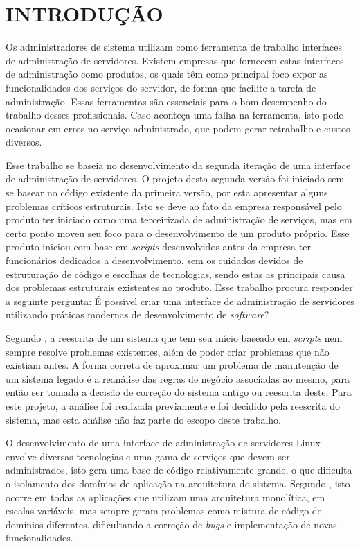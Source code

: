 \chapter{INTRODUÇÃO}
\label{chp:intro}

Os administradores de sistema utilizam como ferramenta de trabalho interfaces
de administração de servidores. Existem empresas que fornecem estas interfaces
de administração como produtos, os quais têm como principal foco expor as
funcionalidades dos serviços do servidor, de forma que facilite a tarefa de
administração. Essas ferramentas são essenciais para o bom desempenho do
trabalho desses profissionais. Caso aconteça uma falha na ferramenta, isto
pode ocasionar em erros no serviço administrado, que podem gerar retrabalho
e custos diversos.

Esse trabalho se baseia no desenvolvimento da segunda iteração de uma
interface de administração de servidores. O projeto desta segunda versão
foi iniciado sem se basear no código existente da primeira versão, por esta
apresentar alguns problemas críticos estruturais. Isto se deve ao fato da
empresa responsável pelo produto ter iniciado como uma terceirizada de
administração de serviços, mas em certo ponto moveu seu foco para o
desenvolvimento de um produto próprio. Esse produto iniciou com base em
\emph{scripts} desenvolvidos antes da empresa ter funcionários dedicados a
desenvolvimento, sem os cuidados devidos de estruturação de código e escolhas
de tecnologias, sendo estas as principais causa dos problemas estruturais
existentes no produto. Esse trabalho procura responder a seguinte pergunta:
É possível criar uma interface de administração de servidores utilizando
práticas modernas de desenvolvimento de \emph{software}?

Segundo , a reescrita de um sistema que tem seu
início baseado em \emph{scripts} nem sempre resolve problemas existentes,
além de poder criar problemas que não existiam antes. A forma correta de
aproximar um problema de manutenção de um sistema legado é a reanálise das
regras de negócio associadas ao mesmo, para então ser tomada a decisão de
correção do sistema antigo ou reescrita deste. Para este projeto, a análise
foi realizada previamente e foi decidido pela reescrita do sistema, mas esta
análise não faz parte do escopo deste trabalho.

O desenvolvimento de uma interface de administração de servidores Linux
envolve diversas tecnologias e uma gama de serviços que devem ser
administrados, isto gera uma base de código relativamente grande, o que
dificulta o isolamento dos domínios de aplicação na arquitetura
do sistema. Segundo , isto ocorre em todas as aplicações
que utilizam uma arquitetura monolítica, em escalas variáveis, mas sempre
geram problemas como mistura de código de domínios diferentes, dificultando
a correção de \emph{bugs} e implementação de novas funcionalidades.

